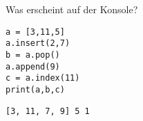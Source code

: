 \question[3]
Was erscheint auf der Konsole?
\begin{lstlisting}
a = [3,11,5]
a.insert(2,7)
b = a.pop()
a.append(9)
c = a.index(11)
print(a,b,c)
\end{lstlisting}

\begin{solutionbox}{1cm}
\texttt{[3, 11, 7, 9] 5 1}
\end{solutionbox}
